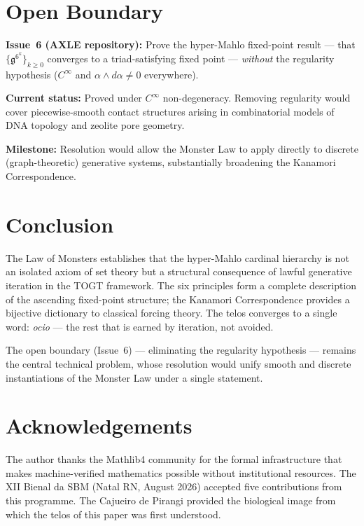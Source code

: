 \documentclass[12pt,a4paper]{amsart}
\theoremstyle{definition}
\theoremstyle{remark}
\newcommand{\GG}{\mathfrak{g}}
\begin{document}
\section{Open Boundary}\label{sec:open}

\begin{tcolorbox}[openBoundary]
\textbf{Issue~6 (AXLE repository):} Prove the hyper-Mahlo fixed-point result ---
that $\{\GG^{6^k}\}_{k \geq 0}$ converges to a triad-satisfying fixed point ---
\emph{without} the regularity hypothesis ($C^\infty$ and $\alpha \wedge d\alpha \neq 0$
everywhere).

\medskip
\textbf{Current status:} Proved under $C^\infty$ non-degeneracy. Removing regularity
would cover piecewise-smooth contact structures arising in combinatorial models of
DNA topology and zeolite pore geometry.

\medskip
\textbf{Milestone:} Resolution would allow the Monster Law to apply directly to
discrete (graph-theoretic) generative systems, substantially broadening the Kanamori
Correspondence.
\end{tcolorbox}

\section{Conclusion}\label{sec:conclusion}

The Law of Monsters establishes that the hyper-Mahlo cardinal hierarchy is not an
isolated axiom of set theory but a structural consequence of lawful generative
iteration in the TOGT framework. The six principles form a complete description of
the ascending fixed-point structure; the Kanamori Correspondence provides a bijective
dictionary to classical forcing theory. The telos converges to a single word:
\emph{ocio} --- the rest that is earned by iteration, not avoided.

The open boundary (Issue~6) --- eliminating the regularity hypothesis --- remains the
central technical problem, whose resolution would unify smooth and discrete
instantiations of the Monster Law under a single statement.

\section*{Acknowledgements}
The author thanks the Mathlib4 community for the formal infrastructure that makes
machine-verified mathematics possible without institutional resources. The XII Bienal
da SBM (Natal RN, August 2026) accepted five contributions from this programme.
The Cajueiro de Pirangi provided the biological image from which the telos of this
paper was first understood.
\end{document}
